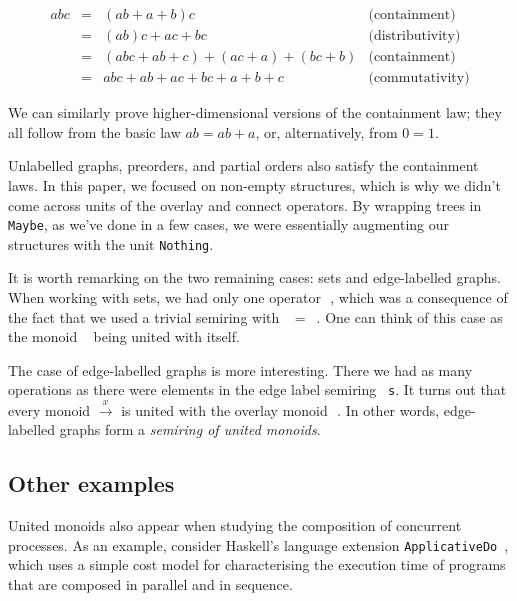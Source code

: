 \documentclass[english,submission]{programming}
\newcommand{\code}[1]{\lstinline[mathescape]|#1|}
\newcommand{\hcode}[1]{{\color{darkblue} \lstinline[keywordstyle={}]|#1|}} %
\newcommand{\hdia}{\,\text{\raisebox{-0.2mm}{\Large\color{darkblue} $\diamond$}}\,}
\newcommand{\zero}{\raisebox{-0.2mm}{\textcircled{\textsf{0}}}\xspace}
\newcommand{\one}{\raisebox{-0.2mm}{\textcircled{\textsf{\hspace{-0.2mm}1}}}\xspace}
\begin{document}
\vspace{-5mm}
\begin{equation*}
\begin{array}{rcll}
\textit{abc} & = & (\textit{ab} + a + b)c & \text{(containment)}\\
 & = & (\textit{ab})c + \textit{ac} + \textit{bc} & \text{(distributivity)}\\
 & = & (\textit{abc} + \textit{ab} + c) + (\textit{ac} + a) + (\textit{bc} + b) & \text{(containment)}\\
 & = & \textit{abc} + \textit{ab} + \textit{ac} + \textit{bc} + a + b + c & \text{(commutativity)}
\end{array}
\end{equation*}
\vspace{-3mm}

\noindent
We can similarly prove higher-dimensional versions of the containment law; they
all follow from the basic law $\textit{ab} = \textit{ab} + a$, or,
alternatively, from $0 = 1$.

Unlabelled graphs, preorders, and partial orders also satisfy the containment
laws. In this paper, we focused on non-empty structures, which is why we didn't
come across units of the overlay and connect operators. By wrapping trees in
\hcode{Maybe}, as we've done in a few cases, we were essentially augmenting our
structures with the unit \hcode{Nothing}.

It is worth remarking on the two remaining cases: sets and edge-labelled graphs.
When working with sets, we had only one operator \hdia, which was a consequence
of the fact that we used a trivial semiring with \zero~$=$~\one. One can think
of this case as the monoid \hdia~being united with itself.

The case of edge-labelled graphs is more interesting. There we had as many
operations as there were elements in the edge label semiring~\hcode{s}. It turns
out that every monoid $\xrightarrow{x}$ is united with the overlay monoid \hdia.
In other words, edge-labelled graphs form a \emph{semiring of united monoids}.

\subsection{Other examples}

United monoids also appear when studying the composition of concurrent
processes. As an example, consider Haskell's language extension
\code{ApplicativeDo}~\cite{applicativedo}, which uses a simple cost model for
characterising the execution time of programs that are composed in parallel and
in sequence.
\end{document}
